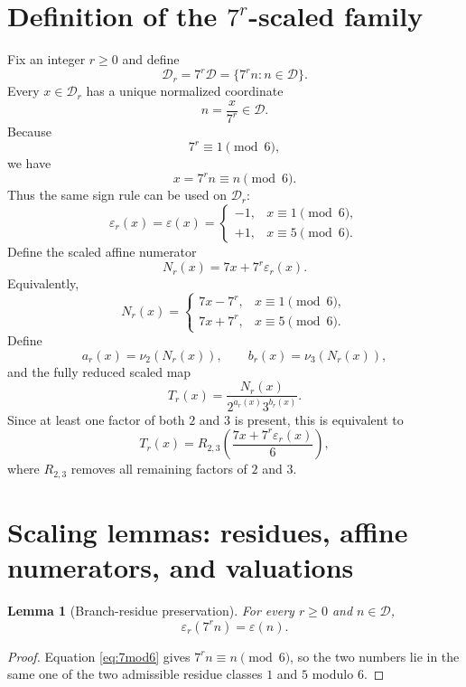 \documentclass[11pt]{article}
\newtheorem{lemma}[theorem]{Lemma}
\newcommand{\eps}{\varepsilon}
\newcommand{\Rtwothree}{R_{2,3}}
\begin{document}
\section{Definition of the $7^r$-scaled family}
Fix an integer $r\ge0$ and define
\begin{equation}
\mathcal D_r=7^r\mathcal D=\{7^rn:n\in\mathcal D\}.
\label{eq:Dr}
\end{equation}
Every $x\in\mathcal D_r$ has a unique normalized coordinate
\[
n=\frac{x}{7^r}\in\mathcal D.
\]
Because
\begin{equation}
7^r\equiv1\pmod6,
\label{eq:7mod6}
\end{equation}
we have
\begin{equation}
x=7^rn\equiv n\pmod6.
\label{eq:respres}
\end{equation}
Thus the same sign rule can be used on $\mathcal D_r$:
\begin{equation}
\eps_r(x)=\eps(x)=\begin{cases}
-1,&x\equiv1\pmod6,\\
+1,&x\equiv5\pmod6.
\end{cases}
\label{eq:epsr}
\end{equation}
Define the scaled affine numerator
\begin{equation}
N_r(x)=7x+7^r\eps_r(x).
\label{eq:Nr}
\end{equation}
Equivalently,
\[
N_r(x)=\begin{cases}
7x-7^r,&x\equiv1\pmod6,\\
7x+7^r,&x\equiv5\pmod6.
\end{cases}
\]
Define
\begin{equation}
a_r(x)=\nu_2(N_r(x)),\qquad b_r(x)=\nu_3(N_r(x)),
\label{eq:arbr}
\end{equation}
and the fully reduced scaled map
\begin{equation}
T_r(x)=\frac{N_r(x)}{2^{a_r(x)}3^{b_r(x)}}.
\label{eq:Tr}
\end{equation}
Since at least one factor of both $2$ and $3$ is present, this is equivalent to
\begin{equation}
T_r(x)=\Rtwothree\!\left(\frac{7x+7^r\eps_r(x)}{6}\right),
\label{eq:Tr-sixform}
\end{equation}
where $\Rtwothree$ removes all remaining factors of $2$ and $3$.

\section{Scaling lemmas: residues, affine numerators, and valuations}
\begin{lemma}[Branch-residue preservation]
For every $r\ge0$ and $n\in\mathcal D$,
\[
\eps_r(7^rn)=\eps(n).
\]
\end{lemma}
\begin{proof}
Equation \eqref{eq:7mod6} gives $7^rn\equiv n\pmod6$, so the two numbers lie in the same one of the two admissible residue classes $1$ and $5$ modulo $6$.
\end{proof}
\end{document}
